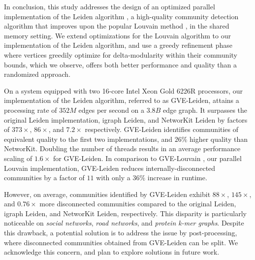 In conclusion, this study addresses the design of an optimized parallel implementation of the Leiden algorithm \cite{com-traag19}, a high-quality community detection algorithm that improves upon the popular Louvain method \cite{com-blondel08}, in the shared memory setting. We extend optimizations for the Louvain algorithm \cite{sahu2023gvelouvain} to our implementation of the Leiden algorithm, and use a greedy refinement phase where vertices greedily optimize for delta-modularity within their community bounds, which we observe, offers both better performance and quality than a randomized approach.

On a system equipped with two 16-core Intel Xeon Gold 6226R processors, our implementation of the Leiden algorithm, referred to as GVE-Leiden, attains a processing rate of $352 M$ edges per second on a $3.8 B$ edge graph. It surpasses the original Leiden implementation, igraph Leiden, and NetworKit Leiden by factors of $373\times$, $86\times$, and $7.2\times$ respectively. GVE-Leiden identifies communities of equivalent quality to the first two implementations, and $26\%$ higher quality than NetworKit. Doubling the number of threads results in an average performance scaling of $1.6\times$ for GVE-Leiden. In comparison to GVE-Louvain \cite{sahu2023gvelouvain}, our parallel Louvain implementation, GVE-Leiden reduces internally-disconnected communities by a factor of $11$ with only a $36\%$ increase in runtime.

However, on average, communities identified by GVE-Leiden exhibit $88\times$, $145\times$, and $0.76\times$ more disconnected communities compared to the original Leiden, igraph Leiden, and NetworKit Leiden, respectively. This disparity is particularly noticeable on \textit{social networks}, \textit{road networks}, and \textit{protein k-mer graphs}. Despite this drawback, a potential solution is to address the issue by post-processing, where disconnected communities obtained from GVE-Leiden can be split. We acknowledge this concern, and plan to explore solutions in future work.
